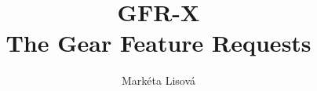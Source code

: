 \documentclass[12pt,a4paper,twoside,titlepage]{book}
\begin{document}
\frontmatter
\title{GFR-X\\ \large The Gear Feature Requests}
\renewcommand{\docversion}{0.1}
\author{Markéta Lisová}
\maketitle
\clearemptydoublepage
\tableofcontents

\mainmatter
\sloppy



\appendix
\end{document}
